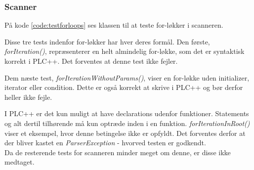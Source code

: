 \subsubsection{Scanner}

På kode \ref{code:testforloops} ses klassen til at teste for-løkker i scanneren. 


\noindent Disse tre tests indenfor for-løkker har hver deres formål. Den første, \textit{forIteration()}, repræsenterer en helt almindelig for-løkke, som det er syntaktisk korrekt i PLC++. Det forventes at denne test ikke fejler.

Dem næste test, \textit{forIterationWithoutParams()}, viser en for-løkke uden initializer, iterator eller condition. Dette er også korrekt at skrive i PLC++ og bør derfor heller ikke fejle. 

I PLC++ er det kun muligt at have declarations udenfor funktioner. Statements og alt dertil tilhørende må kun optræde inden i en funktion. \textit{forIterationInRoot()} viser et eksempel, hvor denne betingelse ikke er opfyldt. Det forventes derfor at der bliver kastet en \textit{ParserException} - hvorved testen er godkendt.\\

\noindent Da de resterende tests for scanneren minder meget om denne, er disse ikke medtaget. 